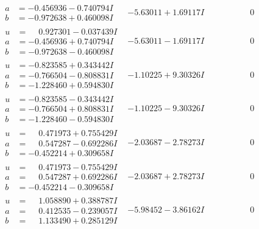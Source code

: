 \documentclass[1p]{elsarticle_modified}
\theoremstyle{definition}
\begin{document}
$$\begin{array}{c|c|c}
\begin{aligned}
a &= -0.456936 - 0.740794 I \\
b &= -0.972638 + 0.460098 I\end{aligned}
 & -5.63011 + 1.69117 I & \phantom{-0.000000 } 0 \\ \hline\begin{aligned}
u &= \phantom{-}0.927301 - 0.037439 I \\
a &= -0.456936 + 0.740794 I \\
b &= -0.972638 - 0.460098 I\end{aligned}
 & -5.63011 - 1.69117 I & \phantom{-0.000000 } 0 \\ \hline\begin{aligned}
u &= -0.823585 + 0.343442 I \\
a &= -0.766504 - 0.808831 I \\
b &= -1.228460 + 0.594830 I\end{aligned}
 & -1.10225 + 9.30326 I & \phantom{-0.000000 } 0 \\ \hline\begin{aligned}
u &= -0.823585 - 0.343442 I \\
a &= -0.766504 + 0.808831 I \\
b &= -1.228460 - 0.594830 I\end{aligned}
 & -1.10225 - 9.30326 I & \phantom{-0.000000 } 0 \\ \hline\begin{aligned}
u &= \phantom{-}0.471973 + 0.755429 I \\
a &= \phantom{-}0.547287 - 0.692286 I \\
b &= -0.452214 + 0.309658 I\end{aligned}
 & -2.03687 - 2.78273 I & \phantom{-0.000000 } 0 \\ \hline\begin{aligned}
u &= \phantom{-}0.471973 - 0.755429 I \\
a &= \phantom{-}0.547287 + 0.692286 I \\
b &= -0.452214 - 0.309658 I\end{aligned}
 & -2.03687 + 2.78273 I & \phantom{-0.000000 } 0 \\ \hline\begin{aligned}
u &= \phantom{-}1.058890 + 0.388787 I \\
a &= \phantom{-}0.412535 - 0.239057 I \\
b &= \phantom{-}1.133490 + 0.285129 I\end{aligned}
 & -5.98452 - 3.86162 I & \phantom{-0.000000 } 0 \\ \hline\begin{aligned}

\end{aligned}
\end{array}$$
\end{document}
